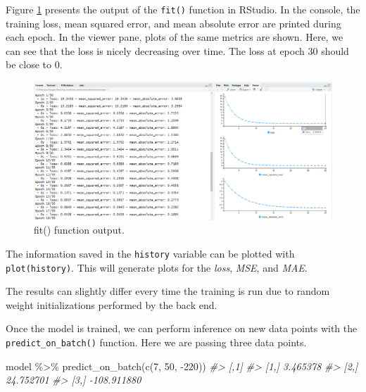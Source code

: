 \documentclass[
  11pt,
]{krantz}
\makeatletter
\newenvironment{Shaded}{\begin{snugshade}}{\end{snugshade}}
\newcommand{\CommentTok}[1]{\textcolor[rgb]{0.37,0.37,0.37}{\textit{#1}}}
\newcommand{\DecValTok}[1]{\textcolor[rgb]{0.06,0.06,0.06}{#1}}
\newcommand{\FunctionTok}[1]{\textcolor[rgb]{0,0,0}{#1}}
\newcommand{\NormalTok}[1]{#1}
\newcommand{\SpecialCharTok}[1]{\textcolor[rgb]{0,0,0}{#1}}
\newenvironment{kframe}{%
\medskip{}
\setlength{\fboxsep}{.8em}
 \def\at@end@of@kframe{}%
 \ifinner\ifhmode%
  \def\at@end@of@kframe{\end{minipage}}%
  \begin{minipage}{\columnwidth}%
 \fi\fi%
 \def\FrameCommand##1{\hskip\@totalleftmargin \hskip-\fboxsep
 \colorbox{shadecolor}{##1}\hskip-\fboxsep
     \hskip-\linewidth \hskip-\@totalleftmargin \hskip\columnwidth}%
 \MakeFramed {\advance\hsize-\width
   \@totalleftmargin\z@ \linewidth\hsize
   \@setminipage}}%
 {\par\unskip\endMakeFramed%
 \at@end@of@kframe}
\newenvironment{rmdblock}[1]
  {
  \begin{itemize}
  \renewcommand{\labelitemi}{
    \raisebox{-.7\height}[0pt][0pt]{
      {\setkeys{Gin}{width=3em,keepaspectratio}\texttt{[image: images/icons/\#1]}}
    }
  }
  \setlength{\fboxsep}{1em}
  \begin{kframe}
  \item
  }
  {
  \end{kframe}
  \end{itemize}
  }
\newenvironment{rmdcaution}
  {\begin{rmdblock}{caution}}
  {\end{rmdblock}}
\makeatother
\begin{document}
Figure \ref{fig:nnEpochs} presents the output of the \texttt{fit()} function in RStudio. In the console, the training loss, mean squared error, and mean absolute error are printed during each epoch. In the viewer pane, plots of the same metrics are shown. Here, we can see that the loss is nicely decreasing over time. The loss at epoch \(30\) should be close to \(0\).

\begin{figure}

{\centering \includegraphics[width=1\linewidth]{images/nn_epochs} 

}

\caption{fit() function output.}\label{fig:nnEpochs}
\end{figure}

The information saved in the \texttt{history} variable can be plotted with \texttt{plot(history)}. This will generate plots for the \emph{loss}, \emph{MSE}, and \emph{MAE}.

\begin{rmdcaution}
The results can slightly differ every time the training is run due to random weight initializations performed by the back end.
\end{rmdcaution}

Once the model is trained, we can perform inference on new data points with the \texttt{predict\_on\_batch()} function. Here we are passing three data points.

\begin{Shaded}
\begin{Highlighting}[]
\NormalTok{model }\SpecialCharTok{\%\textgreater{}\%} \FunctionTok{predict\_on\_batch}\NormalTok{(}\FunctionTok{c}\NormalTok{(}\DecValTok{7}\NormalTok{, }\DecValTok{50}\NormalTok{, }\SpecialCharTok{{-}}\DecValTok{220}\NormalTok{))}
\CommentTok{\#\textgreater{}  [,1]}
\CommentTok{\#\textgreater{}  [1,]    3.465378}
\CommentTok{\#\textgreater{}  [2,]   24.752701}
\CommentTok{\#\textgreater{}  [3,] {-}108.911880}
\end{Highlighting}
\end{Shaded}
\end{document}
